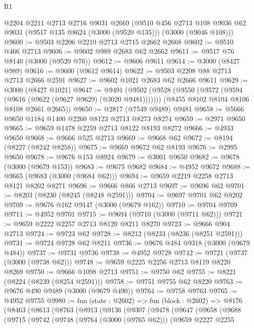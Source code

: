 \begin{lexlean}{R1}
\begin{coremodule}
    @2204
    @2211
    @2713
    @2716
    @9031
    @2669
    (@9510
      @456
      @2713
      @108
      @9036
      @62
      @9031
      (@9517 @135 @8624 (@3000 (@9520 @135)))
      (@3000 (@9046 @108)))
@9600 := @9503 @2206 @2210 @2713 @2715 @2662 @2668
@9602 := @9510 @466 @2713
@9606 := @9602 @989 @2683 @62 @2662
@9611 := @9517 @76 @8140 (@3000 (@9520 @76))
@9612 := @9606 @9611
@9614 := @3000 (@8427 @989)
@9616 := @9600 (@9612 @9614)
@9622 := @9503 @2208 @88 @2713 @2713 @2666 @2591
@9627 := @9602 @1021 @2683 @62 @2666 @9611
@9629 := @3000 (@8427 @1021)
@9647 := @9491
    (@9502
      (@9528 (@9550 (@9572 (@9594 (@9616 (@9622 (@9627 @9629) (@3020 @9481)))))))
      (@8455 @8102 @8104 @8106 @8108 @2661 @2665))
@9650 := @2817 (@7549 @9489) @9481
@9658 := @5666 @9650 @1184 @1400 @2260 @8123 @2713 @8273 @8274
@9659 := @2971 @9650
@9665 := @9659 @1478 @2259 @2713 @8122 @8193 @8272
@9666 := @4933 @9650
@9668 := @9666 @525 @2713
@9669 := @9668 @62
@9672 := @8194 (@8227 (@8242 @8258))
@9675 := @9669 @9672 @62 @8193
@9676 := @2995 @9650
@9678 := @9676 @153 @8924
@9679 := @3001 @9650
@9682 := @9678 (@3000 (@9679 @153))
@9683 := @9675 @9682
@9684 := @4952 @9672
@9688 := @9665 (@9683 (@3000 (@9684 @62)))
@9694 := @9659 @2219 @2258 @2713 @8121 @8202 @8271
@9696 := @9666 @866 @2713
@9697 := @9696 @62
@9701 := @8203 (@8230 (@8245 (@8248 @2591)))
@9704 := @9697 @9701 @62 @8202
@9709 := @9676 @162 @9147 (@3000 (@9679 @162))
@9710 := @9704 @9709
@9711 := @4952 @9701
@9715 := @9694 (@9710 (@3000 (@9711 @62)))
@9721 := @9659 @2222 @2257 @2713 @8120 @8211 @8270
@9723 := @9666 @904 @2713
@9724 := @9723 @62
@9728 := @8212 (@8233 (@8236 (@8251 @2591)))
@9731 := @9724 @9728 @62 @8211
@9736 := @9676 @484 @9318 (@3000 (@9679 @484))
@9737 := @9731 @9736
@9738 := @4952 @9728
@9742 := @9721 (@9737 (@3000 (@9738 @62)))
@9748 := @9659 @2225 @2256 @2713 @8119 @8220 @8269
@9750 := @9666 @1098 @2713
@9751 := @9750 @62
@9755 := @8221 (@8224 (@8239 (@8254 @2591)))
@9758 := @9751 @9755 @62 @8220
@9763 := @9676 @490 @9489 (@3000 (@9679 @490))
@9764 := @9758 @9763
@9765 := @4952 @9755
@9980 := fun (state : @2602) =>
  fun (block : @2602) =>
  @8176
    (@8463
      (@8613
        (@8763
          (@8913
            (@9136
              (@9307
                (@9478
                  (@9647
                    (@9658
                      (@9688
                        (@9715
                          (@9742
                            (@9748
                              (@9764 (@3000 (@9765 @62)))
                              (@9659
                                @2227
                                @2255

\end{coremodule}
\end{lexlean}
